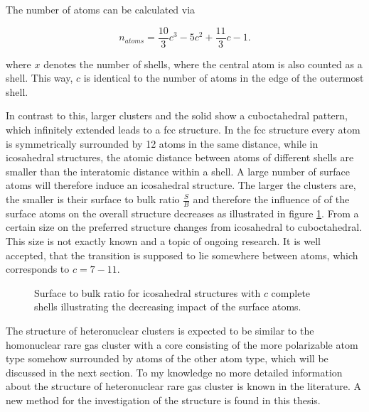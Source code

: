 The number of atoms can be calculated via

\begin{equation}
  n_{atoms} = \frac{10}{3} c^3 - 5 c^2 + \frac{11}{3} c -1 .
\end{equation}

where $x$ denotes the number of shells, where the central atom is
also counted as a shell. \cite{Martin96} This way, $c$ is
identical to the number of atoms
in the edge of the outermost shell.


In contrast to this, larger clusters and the solid show a cuboctahedral
pattern, which infinitely extended leads to a \ac{fcc} structure.
In the \ac{fcc} structure every atom is symmetrically surrounded
by 12 atoms in the same distance, while in icosahedral structures, the
atomic distance between atoms of different shells are smaller than the
interatomic distance within a shell. A large number of surface atoms
will therefore induce an icosahedral structure.
The larger the clusters are, the smaller is their surface to bulk
ratio $\frac{S}{B}$ and therefore the influence of of the surface
atoms on the overall structure decreases as illustrated in
figure \ref{figure:surface_to_bulk}. From a certain size on the
preferred structure changes from icosahedral to cuboctahedral. This size
is not exactly known and a topic of ongoing research. It is well accepted,
that the transition is supposed to lie somewhere between \unit[800--3000]{atoms},
which corresponds to $c = 7 - 11$.

\begin{figure}[h]
 \centering
 
 \caption{Surface to bulk ratio for icosahedral structures with $c$ complete
          shells illustrating the decreasing impact of the surface atoms.}
 \label{figure:surface_to_bulk}
\end{figure}

The structure of heteronuclear clusters is expected to be similar to the
homonuclear rare gas cluster with a core consisting of the more polarizable
atom type somehow surrounded by atoms of the other atom type, which will be discussed
in the next section. To my knowledge no more detailed information about
the structure of heteronuclear rare gas cluster is known in the
literature. A new method for the investigation of the structure is found
in this thesis.


